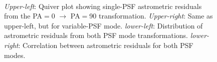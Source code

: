 \documentclass[]{spie}  %
\begin{document}
\begin{figure}[!h]
  \centering
  \\
  \hspace{-1cm}
  \caption{\textit{Upper-left}: Quiver plot showing single-PSF astrometric residuals from the PA$=$0 $\rightarrow$ PA$=$90 transformation. \textit{Upper-right}: Same as upper-left, but for variable-PSF mode. \textit{lower-left}: Distribution of astrometric residuals from both PSF mode transformations. \textit{lower-right}: Correlation between astrometric residuals for both PSF modes.} \label{fig:m53_PA_compare}
\end{figure}
\end{document}
